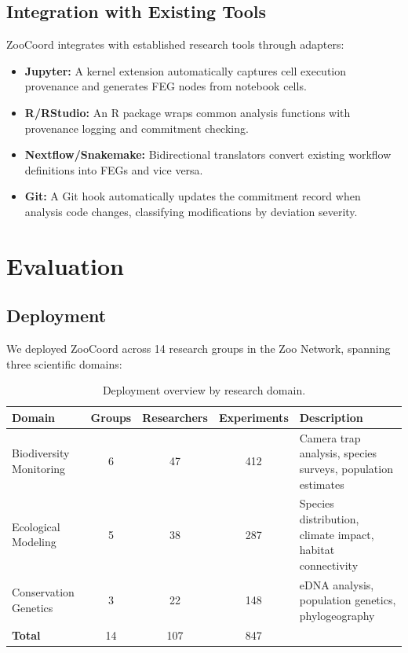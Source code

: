 \documentclass[11pt,a4paper]{article}
\begin{document}
\subsection{Integration with Existing Tools}

ZooCoord integrates with established research tools through adapters:

\begin{itemize}[leftmargin=*]
    \item \textbf{Jupyter:} A kernel extension automatically captures cell execution provenance and generates FEG nodes from notebook cells.
    \item \textbf{R/RStudio:} An R package wraps common analysis functions with provenance logging and commitment checking.
    \item \textbf{Nextflow/Snakemake:} Bidirectional translators convert existing workflow definitions into FEGs and vice versa.
    \item \textbf{Git:} A Git hook automatically updates the commitment record when analysis code changes, classifying modifications by deviation severity.
\end{itemize}

\section{Evaluation}
\label{sec:evaluation}

\subsection{Deployment}

We deployed ZooCoord across 14 research groups in the Zoo Network, spanning three scientific domains:

\begin{table}[H]
\centering
\caption{Deployment overview by research domain.}
\label{tab:deployment}
\begin{tabularx}{\textwidth}{@{}lcccX@{}}
\toprule
\textbf{Domain} & \textbf{Groups} & \textbf{Researchers} & \textbf{Experiments} & \textbf{Description} \\
\midrule
Biodiversity Monitoring & 6 & 47 & 412 & Camera trap analysis, species surveys, population estimates \\
Ecological Modeling & 5 & 38 & 287 & Species distribution, climate impact, habitat connectivity \\
Conservation Genetics & 3 & 22 & 148 & eDNA analysis, population genetics, phylogeography \\
\midrule
\textbf{Total} & 14 & 107 & 847 & \\
\bottomrule
\end{tabularx}
\end{table}
\end{document}
